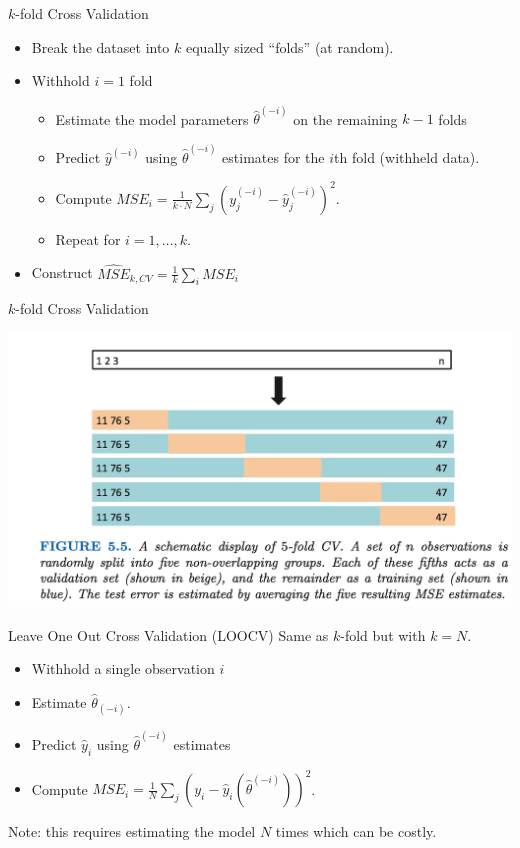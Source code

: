 \begin{frame}{$k$-fold Cross Validation}
  \begin{itemize}
  \item Break the dataset into $k$ equally sized ``folds'' (at random).
  \item Withhold $i=1$ fold
  \begin{itemize}
  \item Estimate the model parameters $\hat{\theta}^{(-i)}$ on the remaining $k-1$ folds
  \item Predict $\hat{y}^{(-i)}$ using $\hat{\theta}^{(-i)}$ estimates for the $i$th fold (withheld data).
  \item Compute $MSE_i =\frac{1}{k \cdot N} \sum_j (y^{(-i)}_j -\hat{y}^{(-i)}_j)^2$.
  \item Repeat for $i=1,\ldots,k$.
  \end{itemize}
  \item Construct $\widehat{MSE}_{k,CV} = \frac{1}{k} \sum_i MSE_{i}$
  \end{itemize}
\end{frame}
  
\begin{frame}{$k$-fold Cross Validation}
  \begin{center}
  \includegraphics[width=\textwidth]{./resources/split-cv5}
  \end{center}
\end{frame}

\begin{frame}{Leave One Out Cross Validation (LOOCV)}
  Same as $k$-fold but with $k=N$.
  \begin{itemize}
  \item Withhold a single observation $i$
  \item Estimate $\hat{\theta}_{(-i)}$.
  \item Predict $\hat{y}_i$ using $\hat{\theta}^{(-i)}$ estimates
  \item Compute $MSE_i =\frac{1}{N} \sum_j (y_i -\hat{y}_i(\hat{\theta}^{(-i)}))^2$.
  \end{itemize}
  \vspace{0.2cm}
  Note: this requires estimating the model $N$ times which can be costly.
\end{frame}
    
